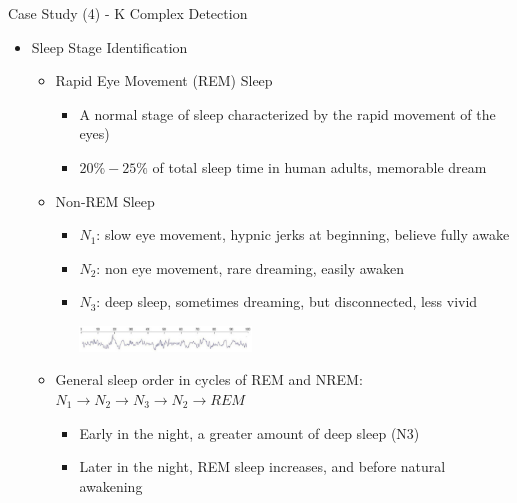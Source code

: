 \documentclass[
 size=14pt,
 paper=smartboard,  %
 mode=present, 		%
 display=slides, 	%
 style=tuliplab,  	%
 pauseslide,
 fleqn,leqno]{powerdot}{}
\begin{document}
\begin{slide}[toc=,bm=]{Case Study (4) - K Complex Detection}
\begin{itemize}
\item Sleep Stage Identification
\begin{itemize}
\item
\small{Rapid Eye Movement (REM) Sleep}
\begin{itemize}
\item
\small{A normal stage of sleep characterized by the rapid movement of the eyes)}
\item
\small{$20\%-25\%$ of total sleep time in human adults, memorable dream}
\end{itemize}
\item<2->
{Non-REM Sleep}
\begin{itemize}
\item<2->
\small{\textbf{$N_1$}: slow eye movement, hypnic jerks at beginning, believe fully awake}
\item<2->
\small{\textbf{$N_2$}: non eye movement, rare dreaming, easily awaken}
\item<2->
\small{\textbf{$N_3$}: deep sleep, sometimes dreaming, but disconnected, less vivid}
\begin{center}
  \includegraphics[width=0.4\textwidth]{figures//theme1//kcd.eps}
\end{center}
\end{itemize}

\item<3->
General sleep order in cycles of REM and NREM:
$N_1 \rightarrow N_2 \rightarrow N_3 \rightarrow N_2 \rightarrow REM$
\begin{itemize}
\item<3->
\small{Early in the night, a greater amount of deep sleep (N3)}
\item<3->
\small{Later in the night, REM sleep increases, and before natural awakening}
\end{itemize}
\end{itemize}
\end{itemize}

\end{slide}
\end{document}
